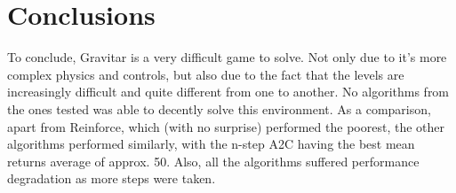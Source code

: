 \documentclass[12pt,a4paper]{report}
\begin{document}
	\chapter{Conclusions}
	
	To conclude, Gravitar is a very difficult game to solve. Not only due to it's more complex physics and controls, but also due to the fact that the levels are increasingly difficult and quite different from one to another. No algorithms from the ones tested was able to decently solve this environment. As a comparison, apart from Reinforce, which (with no surprise) performed the poorest, the other algorithms performed similarly, with the n-step A2C having the best mean returns average of approx. 50. Also, all the algorithms suffered performance degradation as more steps were taken. 
	
	
	
\end{document}
